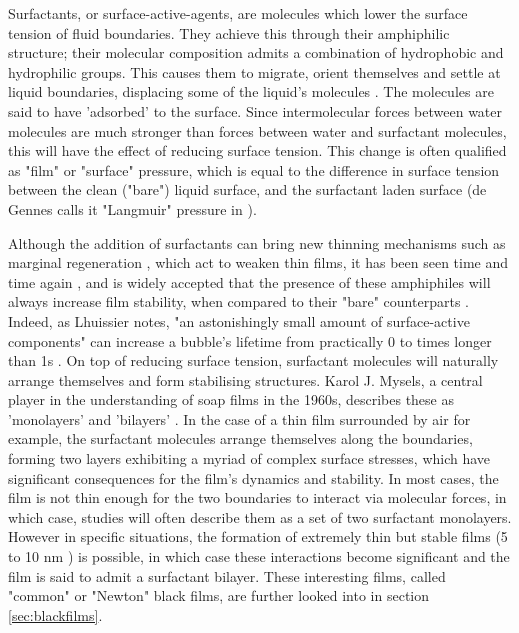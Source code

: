 \documentclass[a4paper,12pt]{article}
\numberwithin{equation}{section}
\numberwithin{figure}{section}
\numberwithin{table}{section}
\begin{document}
Surfactants, or surface-active-agents, are molecules which lower the surface tension of fluid boundaries. They achieve this through their amphiphilic structure; their molecular composition admits a combination of hydrophobic and hydrophilic groups. This causes them to migrate, orient themselves and settle at liquid boundaries, displacing some of the liquid's molecules \cite{Gast1997}. The molecules are said to have 'adsorbed' to the surface. Since intermolecular forces between water molecules are much stronger than forces between water and surfactant molecules, this will have the effect of reducing surface tension. This change is often qualified as "film" or "surface" pressure, which is equal to the difference in surface tension between the clean ("bare") liquid surface, and the surfactant laden surface \cite{Bhamla2017} (de Gennes calls it "Langmuir" pressure in \cite{deGennesYoung2001}).  %

Although the addition of surfactants can bring new thinning mechanisms such as marginal regeneration \cite{Mysels1959Book, Nierstrasz1999}, which act to weaken thin films, it has been seen time and time again \cite{Bhamla2017, ChampougnyNotBare2016, Modini2013, Lhuissier2011, Pfeiffer2020}, and is widely accepted that the presence of these amphiphiles will always increase film stability, when compared to their "bare" counterparts \cite{Debregeas1998}. Indeed, as Lhuissier notes, "an astonishingly small amount of surface-active components" can increase a bubble's lifetime from practically 0 to times longer than 1s \cite{Lhuissier2011, Breward2002}. On top of reducing surface tension, surfactant molecules will naturally arrange themselves and form stabilising structures. Karol J. Mysels, a central player in the understanding of soap films in the 1960s, describes these as 'monolayers' and 'bilayers' \cite{Mysels1968Nomenclature}. In the case of a thin film surrounded by air for example, the surfactant molecules arrange themselves along the boundaries, forming two layers exhibiting a myriad of complex surface stresses, which have significant consequences for the film's dynamics and stability. In most cases, the film is not thin enough for the two boundaries to interact via molecular forces, in which case, studies will often describe them as a set of two surfactant monolayers. However in specific situations, the formation of extremely thin but stable films (5 to 10 nm \cite{Seung2006}) is possible, in which case these interactions become significant and the film is said to admit a surfactant bilayer. These interesting films, called "common" or "Newton" black films, are further looked into in section \ref{sec:blackfilms}.
\end{document}
